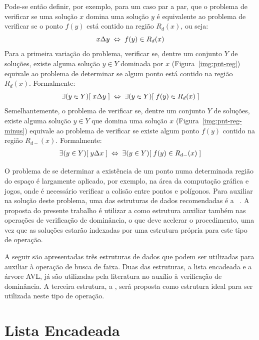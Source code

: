 Pode-se então definir, por exemplo, para um caso par a par, que o problema de verificar se uma
solução $x$ domina uma solução $y$ é equivalente ao problema de verificar se
o ponto $f(y)$ está contido na região $R_d(x)$, ou seja:
\begin{displaymath}
    x \Delta y \; \Leftrightarrow \; f(y) \in R_d(x)
\end{displaymath}
\noindent Para a primeira variação do problema, verificar se, dentre um conjunto $Y$
de soluções, existe alguma solução $y \in Y$ dominada por $x$ (Figura~\ref{img:pnt-reg}) equivale ao problema de
determinar se algum ponto está contido na região $R_d(x)$. Formalmente:
\begin{displaymath}
  \exists(y \in Y)[\; x \Delta y \;] \; \Leftrightarrow \;
    \exists(y \in Y)[\;f(y) \in R_{d}(x)\;]
\end{displaymath}
\noindent Semelhantemente, o problema de verificar se, dentre um conjunto $Y$
de soluções, existe alguma solução $y \in Y$ que domina uma solução $x$ (Figura~\ref{img:pnt-reg-minus}) equivale ao
problema de verificar se existe algum ponto $f(y)$ contido na região $R_{d-}(x)$.
Formalmente:
\begin{align*}
  \exists(y \in Y)[\; y \Delta x \;] \; \Leftrightarrow \;
    \exists(y \in Y)[\;f(y) \in R_{d-}(x)\;] \\
\end{align*}

O problema de se determinar a existência de um ponto numa determinada região do
espaço é largamente aplicado, por exemplo, na área da
computação gráfica e jogos, onde é necessário verificar a colisão entre pontos e polígonos.
Para auxiliar na solução deste problema, uma das estruturas de dados recomendadas é a \kdtree{}
~\cite{agarwal1999geometric}.
A proposta do presente trabalho é utilizar a \kdtree{} como estrutura auxiliar também
nas operações de verificação de dominância, o que deve acelerar o procedimento,
uma vez que as soluções estarão indexadas por uma estrutura própria para este tipo
de operação.

A seguir são apresentadas três estruturas de dados que podem ser utilizadas para
auxiliar à operação de busca de faixa.
Duas das estruturas, a lista encadeada e a árvore AVL, já são utilizadas pela
literatura no auxílio à verificação de dominância.
A terceira estrutura, a \kdtree{}, será proposta
como estrutura ideal para ser utilizada neste tipo de operação.

\section{Lista Encadeada}

